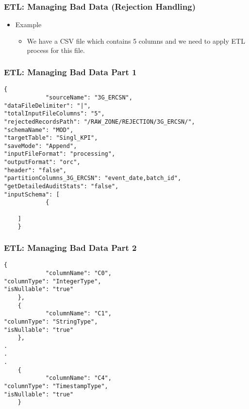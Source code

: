 \begin{frame}[fragile]
	\frametitle{ETL: Managing Bad Data (Rejection Handling)}

	\begin{itemize}[<+->]
		\item Example
		\begin{itemize}[<+->]
			\item  We have a CSV file which contains 5 columns and we need to apply ETL process for this file.
		\end{itemize}
	\end{itemize}



\end{frame}
\begin{frame}[fragile]
	\frametitle{ETL: Managing Bad Data Part 1}

	\begin{lstlisting}[style=json]
	{
			"sourceName": "3G_ERCSN",
"dataFileDelimiter": "|",
"totalInputFileColumns": "5",
"rejectedRecordsPath": "/RAW_ZONE/REJECTION/3G_ERCSN/",
"schemaName": "MOD",
"targetTable": "Singl_KPI",
"saveMode": "Append",
"inputFileFormat": "processing",
"outputFormat": "orc",
"header": "false",
"partitionColumns_3G_ERCSN": "event_date,batch_id",
"getDetailedAuditStats": "false",
"inputSchema": [
			{

	]
	}
	\end{lstlisting}

\end{frame}
\begin{frame}[fragile]
	\frametitle{ETL: Managing Bad Data Part 2}

	\begin{lstlisting}[style=json,basicstyle=\scriptsize ]
	{
			"columnName": "C0",
"columnType": "IntegerType",
"isNullable": "true"
	},
	{
			"columnName": "C1",
"columnType": "StringType",
"isNullable": "true"
	},
.
.
.
	{
			"columnName": "C4",
"columnType": "TimestampType",
"isNullable": "true"
	}
	\end{lstlisting}

\end{frame}

